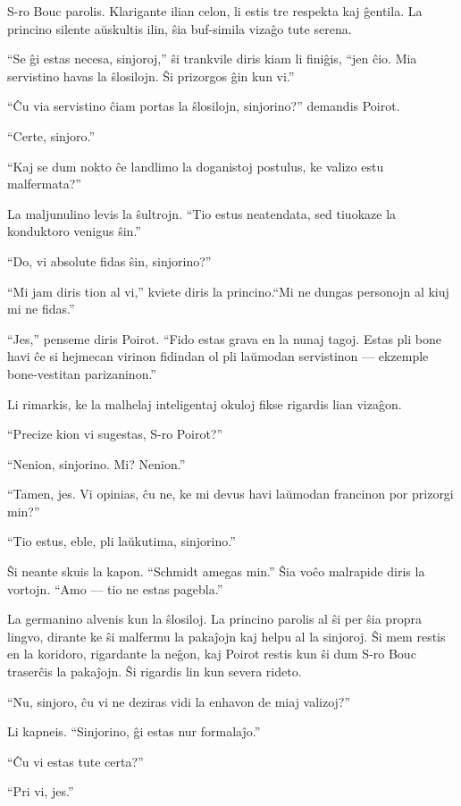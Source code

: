 S-ro Bouc parolis. Klarigante ilian celon, li estis tre respekta kaj ĝentila. La princino silente aŭskultis ilin, ŝia buf-simila vizaĝo tute serena.

``Se ĝi estas necesa, sinjoroj,'' ŝi trankvile diris kiam li finiĝis, ``jen ĉio. Mia servistino havas la ŝlosilojn. Ŝi prizorgos ĝin kun vi.''

``Ĉu via servistino ĉiam portas la ŝlosilojn, sinjorino?'' demandis Poirot.

``Certe, sinjoro.''

``Kaj se dum nokto ĉe landlimo la doganistoj postulus, ke valizo estu malfermata?''

La maljunulino levis la ŝultrojn. ``Tio estus neatendata, sed tiuokaze la konduktoro venigus ŝin.''

``Do, vi absolute fidas ŝin, sinjorino?''

``Mi jam diris tion al vi,'' kviete diris la princino.``Mi ne dungas personojn al kiuj mi ne fidas.''

``Jes,'' penseme diris Poirot. ``Fido estas grava en la nunaj tagoj. Estas pli bone havi ĉe si hejmecan virinon fidindan ol pli laŭmodan servistinon --- ekzemple bone-vestitan parizaninon.''

Li rimarkis, ke la malhelaj inteligentaj okuloj fikse rigardis lian vizaĝon.

``Precize kion vi sugestas, S-ro Poirot?''

``Nenion, sinjorino. Mi? Nenion.''

``Tamen, jes. Vi opinias, ĉu ne, ke mi devus havi laŭmodan francinon por prizorgi min?''

``Tio estus, eble, pli laŭkutima, sinjorino.''

Ŝi neante skuis la kapon. ``Schmidt amegas min.'' Ŝia voĉo malrapide diris la vortojn. ``Amo --- tio ne estas pagebla.''

La germanino alvenis kun la ŝlosiloj. La princino parolis al ŝi per ŝia propra lingvo, dirante ke ŝi malfermu la pakaĵojn kaj helpu al la sinjoroj. Ŝi mem restis en la koridoro, rigardante la neĝon, kaj Poirot restis kun ŝi dum S-ro Bouc traserĉis la pakaĵojn. Ŝi rigardis lin kun severa rideto.

``Nu, sinjoro, ĉu vi ne deziras vidi la enhavon de miaj valizoj?''

Li kapneis. ``Sinjorino, ĝi estas nur formalaĵo.''

``Ĉu vi estas tute certa?''

``Pri vi, jes.''

